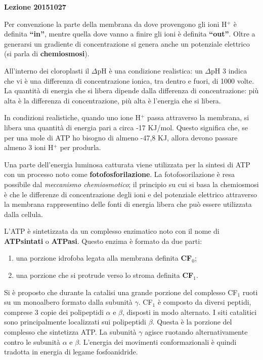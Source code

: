\documentclass[]{article}
\begin{document}
\textbf{Lezione 20151027}

Per convenzione la parte della membrana da dove provengono gli ioni
H$^+$ è definita \textbf{``in''}, mentre quella dove vanno a finire gli
ioni è definita \textbf{``out''}. Oltre a generarsi un gradiente di
concentrazione si genera anche un potenziale elettrico (si parla di
\textbf{chemiosmosi}).

All'interno dei cloroplasti il $\Delta$pH è una condizione realistica:
un $\Delta$pH 3 indica che vi è una differenza di concentrazione ionica,
tra dentro e fuori, di 1000 volte. La quantità di energia che si libera
dipende dalla differenza di concentrazione: più alta è la differenza di
concentrazione, più alta è l'energia che si libera.

In condizioni realistiche, quando uno ione H$^+$ passa attraverso la
membrana, si libera una quantità di energia pari a circa -17 KJ/mol.
Questo significa che, se per una mole di ATP ho bisogno di almeno -47,8
KJ, allora devono passare almeno 3 ioni H$^+$ per produrla.

Una parte dell'energia luminosa catturata viene utilizzata per la
sintesi di ATP con un processo noto come \textbf{fotofosforilazione}. La
fotofosorilazione è resa possibile dal \emph{meccanismo chemiosmotico};
il principio su cui si basa la chemiosmosi è che le differenze di
concentrazione degli ioni e del potenziale elettrico attraverso la
membrana rappresentino delle fonti di energia libera che può essere
utilizzata dalla cellula.

L'ATP è sintetizzata da un complesso enzimatico noto con il nome di
\textbf{ATPsintati} o \textbf{ATPasi}. Questo enzima è formato da due
parti:

\begin{enumerate}
\def\labelenumi{\arabic{enumi}.}
\itemsep1pt\parskip0pt
\item
  una porzione idrofoba legata alla membrana definita \textbf{CF$_0$};
\item
  una porzione che si protrude verso lo stroma definita \textbf{CF$_1$}.
\end{enumerate}

Si è proposto che durante la catalisi una grande porzione del complesso
CF$_1$ ruoti su un monoalbero formato dalla subunità $\gamma$. CF$_1$ è
composto da diversi peptidi, comprese 3 copie dei polipeptidi $\alpha$ e
$\beta$, disposti in modo alternato. I siti catalitici sono
principalmente localizzati sui polipeptidi $\beta$. Questa è la porzione
del complesso che sintetizza ATP. La subunità $\gamma$ agisce ruotando
alternativamente contro le subunità $\alpha$ e $\beta$. L'energia dei
movimenti conformazionali è quindi tradotta in energia di legame
fosfoanidride.
\end{document}

